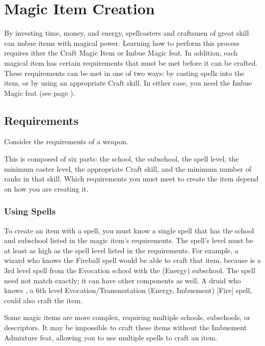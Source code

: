\section{Magic Item Creation}\label{Magic Item Creation}\label{Creating Magic Items}

    By investing time, money, and energy, spellcasters and craftsmen of great skill can imbue items with magical power. Learning how to perform this process requires ither the Craft Magic Item or Imbue Magic feat. In addition, each magical item has certain requirements that must be met before it can be crafted. These requirements can be met in one of two ways: by casting spells into the item, or by using an appropriate Craft skill. In either case, you need the Imbue Magic feat (see page ).

\subsection{Requirements}
Consider the requirements of a  weapon.


This is composed of six parts: the school, the subschool, the spell level, the minimum caster level, the appropriate Craft skill, and the minimum number of ranks in that skill. Which requirements you must meet to create the item depend on how you are creating it.

\subsubsection{Using Spells}
To create an item with a spell, you must know a single spell that has the school and subschool listed in the magic item's requirements. The spell's level must be at least as high as the spell level listed in the requirements. For example, a wizard who knows the Fireball spell would be able to craft that item, because  is a 3rd level spell from the Evocation school with the (Energy) subschool. The spell need not match exactly; it can have other components as well. A druid who knows , a 6th level Evocation/Transmutation (Energy, Imbuement) [Fire] spell, could also craft the item.

Some magic items are more complex, requiring multiple schools, subschools, or descriptors. It may be impossible to craft these items without the Imbuement Admixture feat, allowing you to use multiple spells to craft an item.

